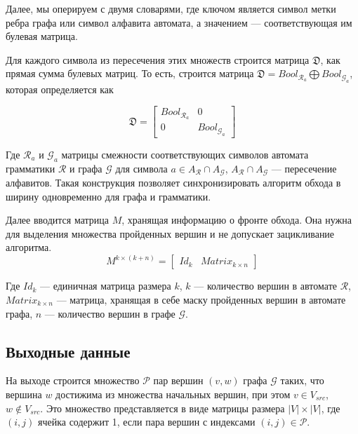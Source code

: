 Далее, мы оперируем с двумя словарями, где ключом является символ метки ребра графа или символ алфавита автомата, а значением --- соответствующая им булевая матрица.

Для каждого символа из пересечения этих множеств строится матрица $\mathfrak{D}$, как прямая сумма булевых матриц. То есть, строится матрица $\mathfrak{D} = Bool_{\mathcal{R}_a} \bigoplus Bool_{\mathcal{G}_a}$, которая определяется как

\begin{equation}
\mathfrak{D} = 
  \left[
    \begin{matrix}
        Bool_{\mathcal{R}_a} & 0\\
        0 & Bool_{\mathcal{G}_a}
    \end{matrix}
  \right]
\end{equation}

Где $\mathcal{R}_{a}$ и $\mathcal{G}_{a}$ матрицы смежности соответствующих символов автомата грамматики $\mathcal{R}$ и графа $\mathcal{G}$ для символа $a \in A_\mathcal{R} \cap A_\mathcal{G}$, $A_\mathcal{R} \cap A_\mathcal{G}$ --- пересечение алфавитов. Такая конструкция позволяет синхронизировать алгоритм обхода в ширину одновременно для графа и грамматики.

Далее вводится матрица $M$, хранящая информацию о фронте обхода. Она нужна для выделения множества пройденных вершин и не допускает зацикливание алгоритма.
\begin{equation}
M^{k \times (k + n)} =
  \left[
    \begin{matrix}
        Id_k & Matrix_{k \times n }
    \end{matrix}
  \right]
\end{equation}

Где $Id_k$ --- единичная матрица размера $k$, $k$ --- количество вершин в автомате $\mathcal{R}$, $Matrix_{k \times n }$ --- матрица, хранящая в себе маску пройденных вершин в автомате графа, $n$ --- количество вершин в графе $\mathcal{G}$.

\subsection{Выходные данные}

На выходе строится множество $\mathcal{P}$ пар вершин $(v, w)$ графа $\mathcal{G}$ таких, что вершина $w$ достижима из множества начальных вершин, при этом $v \in V_{src}$, $w \not\in V_{src}$. Это множество представляется в виде матрицы размера $|V|\times|V|$, где $(i,j)$ ячейка содержит 1, если пара вершин с индексами $(i, j) \in \mathcal{P}$.

